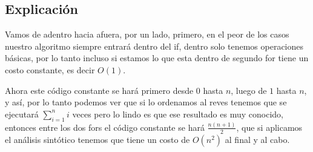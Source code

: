 \documentclass[12pt, fleqn]{article}                            %
\theoremstyle{break}                                            %
\begin{document}
    \subsection{Explicación}

        Vamos de adentro hacia afuera, por un lado, primero, en el peor de los casos
        nuestro algoritmo siempre entrará dentro del if, dentro solo tenemos operaciones
        básicas, por lo tanto incluso si estamos lo que esta dentro de segundo for tiene un costo
        constante, es decir $O(1)$.

        Ahora este código constante se hará primero desde $0$ hasta $n$, luego de $1$ hasta $n$, y 
        así, por lo tanto podemos ver que si lo ordenamos al reves tenemos que se ejecutará $\sum_{i=1}^n i$
        veces pero lo lindo es que ese resultado es muy conocido, entonces entre los dos fors el código
        constante se hará $\frac{n(n+1)}{2}$, que si aplicamos el análisis sintótico tenemos que tiene
        un costo de $O(n^2)$ al final y al cabo.
\end{document}
